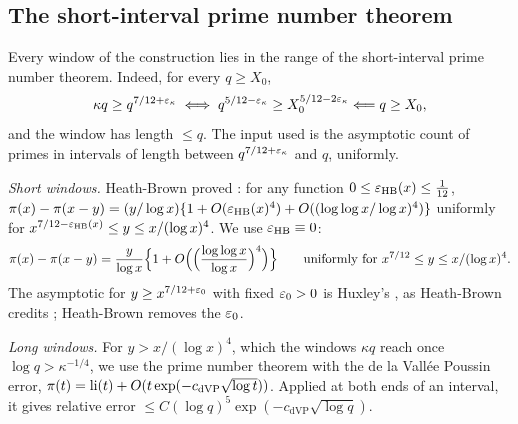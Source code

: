 \subsection{The short-interval prime number theorem}
Every window of the construction lies in the range of the short-interval prime number theorem. Indeed, for every $q\ge X_0$,
\[
  \kappa q\ge q^{7/12+\varepsilon_\kappa}\iff q^{5/12-\varepsilon_\kappa}\ge X_0^{5/12-2\varepsilon_\kappa}\Longleftarrow q\ge X_0,
\]
and the window has length $\le q$. The input used is the asymptotic count of primes in intervals of length between
$q^{7/12+\varepsilon_\kappa}$ and $q$, uniformly.

\emph{Short windows.} Heath-Brown proved \cite[Theorem, (1.2), p.~23]{HeathBrown1988}: for any function $0\le\varepsilon_{\mathrm{HB}}(x)\le\frac1{12}$,
$\pi(x)-\pi(x-y)=(y/\log x)\{1+O(\varepsilon_{\mathrm{HB}}(x)^4)+O((\log\log x/\log x)^4)\}$ uniformly for
$x^{7/12-\varepsilon_{\mathrm{HB}}(x)}\le y\le x/(\log x)^4$. We use
$\varepsilon_{\mathrm{HB}}\equiv0$:
\begin{equation}\label{eq:HB}
  \pi(x)-\pi(x-y)=\frac{y}{\log x}\Bigl\{1+O\Bigl(\Bigl(\frac{\log\log x}{\log x}\Bigr)^4\Bigr)\Bigr\}\qquad\text{uniformly for }
  x^{7/12}\le y\le x/(\log x)^4.
\end{equation}
The asymptotic for $y\ge x^{7/12+\varepsilon_0}$ with fixed $\varepsilon_0>0$ is Huxley's \cite{Huxley1972}, as Heath-Brown credits
\cite[p.~22]{HeathBrown1988}; Heath-Brown removes the $\varepsilon_0$.

\emph{Long windows.} For $y>x/(\log x)^4$, which the windows $\kappa q$ reach once $\log q>\kappa^{-1/4}$, we use the prime number
theorem with the de la Vall\'ee Poussin error, $\pi(t)=\operatorname{li}(t)+O(t\exp(-c_{\mathrm{dVP}}\sqrt{\log t}))$. Applied at both ends of an interval, it gives
relative error $\le C(\log q)^5\exp(-c_{\mathrm{dVP}}\sqrt{\log q})$.

